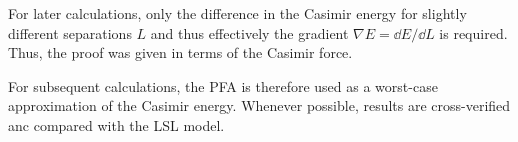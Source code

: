 \begin{remark}
  For later calculations, only the difference in the Casimir energy for slightly different separations $L$ and thus effectively the gradient $\nabla E = \dd E / \dd L$ is required. Thus, the proof was given in terms of the Casimir force.
\end{remark}

For subsequent calculations, the PFA is therefore used as a worst-case approximation of the Casimir energy. Whenever possible, results are cross-verified anc compared with the LSL model.